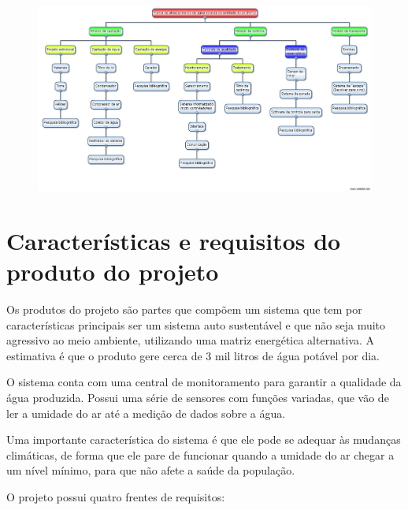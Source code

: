   \begin{figure}[h]
  \begin{center}
    \includegraphics[scale=0.3]{editaveis/figuras/EAP}
    \label{EAP}
  \end{center}
  \end{figure}
  \FloatBarrier
  
  \vfill
\pagebreak
\section*{Características e requisitos do produto do projeto}

  Os produtos do projeto são partes que compõem um sistema que tem por características principais ser um sistema auto sustentável
  e que não seja muito agressivo ao meio ambiente, utilizando uma matriz energética alternativa.
  A estimativa é que o produto gere cerca de 3 mil litros de água potável por dia.
  
  O sistema conta com uma central de monitoramento para garantir a qualidade da água produzida. Possui uma série de sensores
  com funções variadas, que vão de ler a umidade do ar até a medição de dados sobre a água.
  
  Uma importante característica do sistema é que ele pode se adequar às mudanças climáticas, de forma que ele pare de
  funcionar quando a umidade do ar chegar a um nível mínimo, para que não afete a saúde da população.
  
  O projeto possui quatro frentes de requisitos:
  
